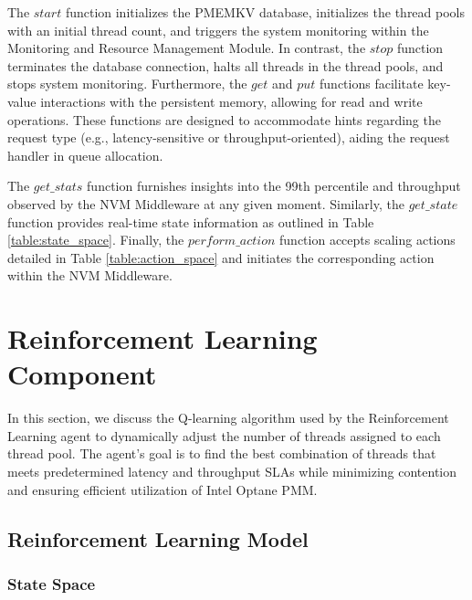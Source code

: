 The $start$ function initializes the PMEMKV database, initializes the thread pools with an initial thread count, and triggers the system monitoring within the Monitoring and Resource Management Module. In contrast, the $stop$ function terminates the database connection, halts all threads in the thread pools, and stops system monitoring. Furthermore, the $get$ and $put$ functions facilitate key-value interactions with the persistent memory, allowing for read and write operations. These functions are designed to accommodate hints regarding the request type (e.g., latency-sensitive or throughput-oriented), aiding the request handler in queue allocation.

The $get\_stats$ function furnishes insights into the 99th percentile and throughput observed by the NVM Middleware at any given moment. Similarly, the $get\_state$ function provides real-time state information as outlined in Table \ref{table:state_space}. Finally, the $perform\_action$ function accepts scaling actions detailed in Table \ref{table:action_space} and initiates the corresponding action within the NVM Middleware.

\section{Reinforcement Learning Component}

In this section, we discuss the Q-learning algorithm used by the Reinforcement Learning agent to dynamically adjust the number of threads assigned to each thread pool. The agent’s goal is to find the best combination of threads that meets predetermined latency and throughput SLAs while minimizing contention and ensuring efficient utilization of Intel Optane PMM. 

\subsection{Reinforcement Learning Model}

\subsubsection{State Space}


